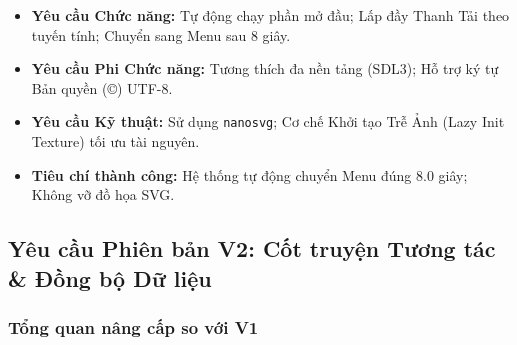 \documentclass[12pt,a4paper]{article}
\begin{document}
\begin{itemize}[leftmargin=*]
\begin{center}
\begin{adjustbox}{max width=\linewidth}
    \end{adjustbox}
    \end{center}
    \item \textbf{Yêu cầu Chức năng:} Tự động chạy phần mở đầu; Lấp đầy Thanh Tải theo tuyến tính; Chuyển sang Menu sau 8 giây.
    \item \textbf{Yêu cầu Phi Chức năng:} Tương thích đa nền tảng (SDL3); Hỗ trợ ký tự Bản quyền (©) UTF-8.
    \item \textbf{Yêu cầu Kỹ thuật:} Sử dụng \texttt{nanosvg}; Cơ chế Khởi tạo Trễ Ảnh (Lazy Init Texture) tối ưu tài nguyên.
    \item \textbf{Tiêu chí thành công:} Hệ thống tự động chuyển Menu đúng 8.0 giây; Không vỡ đồ họa SVG.
\end{itemize}

\newpage
\subsection{Yêu cầu Phiên bản V2: Cốt truyện Tương tác \& Đồng bộ Dữ liệu}

\subsubsection{Tổng quan nâng cấp so với V1}
\end{document}
